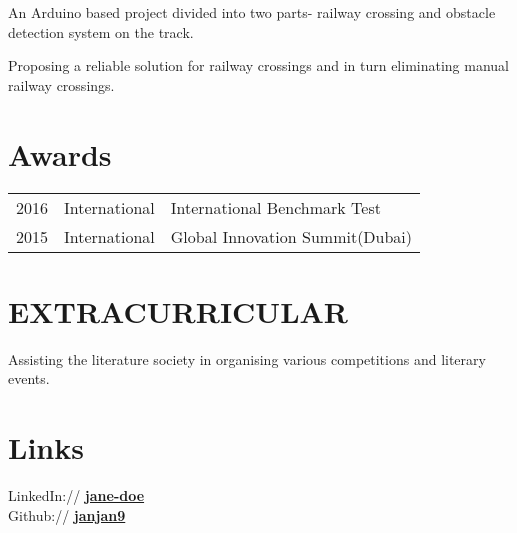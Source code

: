 \documentclass[]{deedy-resume-openfont}
\begin{document}
\begin{minipage}[t]{0.60\textwidth}
\textbullet{}An Arduino based project divided into two parts- railway crossing and obstacle detection system on the track.
\sectionsep

\textbullet{}Proposing a reliable solution for railway crossings and in turn eliminating manual railway crossings.
\sectionsep




\section{Awards} 
\begin{tabular}{rll}

2016	     &International  & International Benchmark Test\\
2015	     &International  & Global Innovation Summit(Dubai)\\

\end{tabular}
\sectionsep


\section{EXTRACURRICULAR}
\textbullet{}Assisting the literature society in organising various competitions and literary events.\\
\sectionsep




\section{Links} 

LinkedIn://  \href{https://www.linkedin.com/in/jane-doe/}{\bf jane-doe} \\
Github:// \href{https://github.com/janjan9}{\bf janjan9} \\

\end{minipage} 
\end{document}
